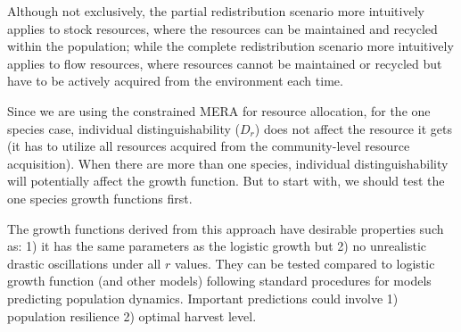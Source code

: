 \documentclass[12pt]{article}
\begin{document}
Although not exclusively, the partial redistribution scenario more intuitively applies to stock resources, where the resources can be maintained and recycled within the population; while the complete redistribution scenario more intuitively applies to flow resources, where resources cannot be maintained or recycled but have to be actively acquired from the environment each time.

Since we are using the constrained MERA for resource allocation, for the one species case, individual distinguishability ($D_r$) does not affect the resource it gets (it has to utilize all resources acquired from the community-level resource acquisition). When there are more than one species, individual distinguishability will potentially affect the growth function. But to start with, we should test the one species growth functions first.

The growth functions derived from this approach have desirable properties such as: 1) it has the same parameters as the logistic growth but 2) no unrealistic drastic oscillations under all $r$ values. They can be tested compared to logistic growth function (and other models) following standard procedures for models predicting population dynamics. Important predictions could involve 1) population resilience 2) optimal harvest level.
\end{document}
